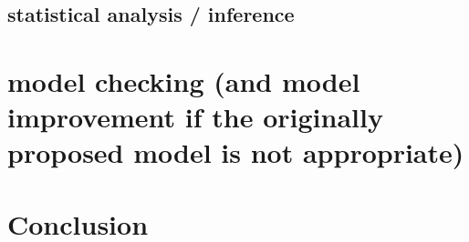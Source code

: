 \documentclass[12pt,notitlepage]{article}
\begin{document}
\subsection{statistical analysis / inference}






\section{model checking (and model improvement if the originally proposed model is not appropriate)}






\section{Conclusion}






\pagebreak

%
%
\end{document}
